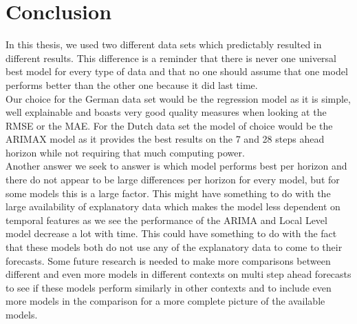 \section{Conclusion}
\label{seq:conclusion}
In this thesis, we used two different data sets which predictably resulted in different results. This difference is a reminder that there is never one universal best model for every type of data and that no one should assume that one model performs better than the other one because it did last time.\\

Our choice for the German data set would be the regression model as it is simple, well explainable and boasts very good quality measures when looking at the RMSE or the MAE. For the Dutch data set the model of choice would be the ARIMAX model as it provides the best results on the 7 and 28 steps ahead horizon while not requiring that much computing power.\\

Another answer we seek to answer is which model performs best per horizon and there do not appear to be large differences per horizon for every model, but for some models this is a large factor. This might have something to do with the large availability of explanatory data which makes the model less dependent on temporal features as we see the performance of the ARIMA and Local Level model decrease a lot with time. This could have something to do with the fact that these models both do not use any of the explanatory data to come to their forecasts. Some future research is needed to make more comparisons between different and even more models in different contexts on multi step ahead forecasts to see if these models perform similarly in other contexts and to include even more models in the comparison for a more complete picture of the available models.